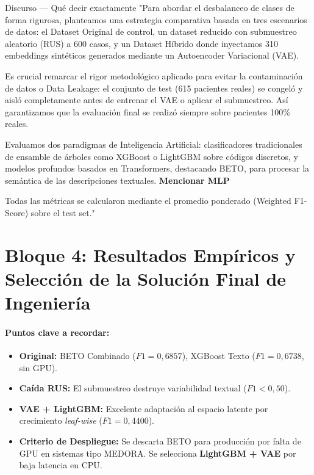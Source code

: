 \documentclass[11pt, a4paper]{article}
\newcommand{\timebadge}[2]{%
  \tcbox[
    on line,
    colback=timeBadge,
    colframe=speechBorder,
    arc=2mm,
    boxrule=0.5pt,
    top=1mm, bottom=1mm, left=2mm, right=2mm
  ]{\small \faClock\ \textbf{#1} \quad \textcolor{gray}{(#2)}}%
}
\begin{document}
\begin{speechbox}{Discurso — Qué decir exactamente}
"Para abordar el desbalanceo de clases de forma rigurosa, planteamos una estrategia comparativa basada en tres escenarios de datos: el Dataset Original de control, un dataset reducido con submuestreo aleatorio (RUS) a 600 casos, y un Dataset Híbrido donde inyectamos 310 embeddings sintéticos generados mediante un Autoencoder Variacional (VAE).

Es crucial remarcar el rigor metodológico aplicado para evitar la contaminación de datos o Data Leakage: el conjunto de test (615 pacientes reales) se congeló y aisló completamente antes de entrenar el VAE o aplicar el submuestreo. Así garantizamos que la evaluación final se realizó siempre sobre pacientes 100\% reales.

Evaluamos dos paradigmas de Inteligencia Artificial: clasificadores tradicionales de ensamble de árboles como XGBoost o LightGBM sobre códigos discretos, y modelos profundos basados en Transformers, destacando BETO, para procesar la semántica de las descripciones textuales. \textbf{Mencionar MLP}  

Todas las métricas se calcularon mediante el promedio ponderado (Weighted F1-Score) sobre el test set."
\end{speechbox}

\clearpage
\section{Bloque 4: Resultados Empíricos y Selección de la Solución Final de Ingeniería}
\timebadge{2 min 30 s}{Minuto 4:30 - 7:00}

\paragraph{Puntos clave a recordar:}
\begin{itemize}[noitemsep]
    \item \textbf{Original:} BETO Combinado ($F1 = 0{,}6857$), XGBoost Texto ($F1 = 0{,}6738$, sin GPU).
    \item \textbf{Caída RUS:} El submuestreo destruye variabilidad textual ($F1 < 0{,}50$).
    \item \textbf{VAE + LightGBM:} Excelente adaptación al espacio latente por crecimiento \textit{leaf-wise} ($F1 = 0{,}4400$).
    \item \textbf{Criterio de Despliegue:} Se descarta BETO para producción por falta de GPU en sistemas tipo MEDORA. Se selecciona \textbf{LightGBM + VAE} por baja latencia en CPU.
\end{itemize}
\end{document}
